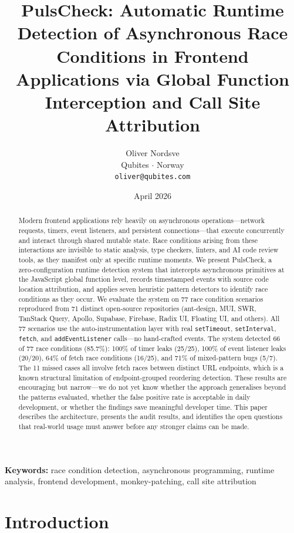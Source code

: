 \documentclass[11pt,a4paper]{article}
\title{PulsCheck: Automatic Runtime Detection of Asynchronous Race Conditions in Frontend Applications via Global Function Interception and Call Site Attribution}
\author{
  Oliver Nordsve \\
  Qubites \(\cdot\) Norway \\
  \texttt{oliver@qubites.com}
}
\date{April 2026}
\begin{document}
\maketitle

\begin{abstract}
Modern frontend applications rely heavily on asynchronous operations---network requests, timers, event listeners, and persistent connections---that execute concurrently and interact through shared mutable state. Race conditions arising from these interactions are invisible to static analysis, type checkers, linters, and AI code review tools, as they manifest only at specific runtime moments. We present PulsCheck, a zero-configuration runtime detection system that intercepts asynchronous primitives at the JavaScript global function level, records timestamped events with source code location attribution, and applies seven heuristic pattern detectors to identify race conditions as they occur. We evaluate the system on 77 race condition scenarios reproduced from 71 distinct open-source repositories (ant-design, MUI, SWR, TanStack Query, Apollo, Supabase, Firebase, Radix UI, Floating UI, and others). All 77 scenarios use the auto-instrumentation layer with real \texttt{setTimeout}, \texttt{setInterval}, \texttt{fetch}, and \texttt{addEventListener} calls---no hand-crafted events. The system detected 66 of 77 race conditions (85.7\%): 100\% of timer leaks (25/25), 100\% of event listener leaks (20/20), 64\% of fetch race conditions (16/25), and 71\% of mixed-pattern bugs (5/7). The 11 missed cases all involve fetch races between distinct URL endpoints, which is a known structural limitation of endpoint-grouped reordering detection. These results are encouraging but narrow---we do not yet know whether the approach generalises beyond the patterns evaluated, whether the false positive rate is acceptable in daily development, or whether the findings save meaningful developer time. This paper describes the architecture, presents the audit results, and identifies the open questions that real-world usage must answer before any stronger claims can be made.
\end{abstract}

\noindent\textbf{Keywords:} race condition detection, asynchronous programming, runtime analysis, frontend development, monkey-patching, call site attribution

\section{Introduction}
\end{document}
